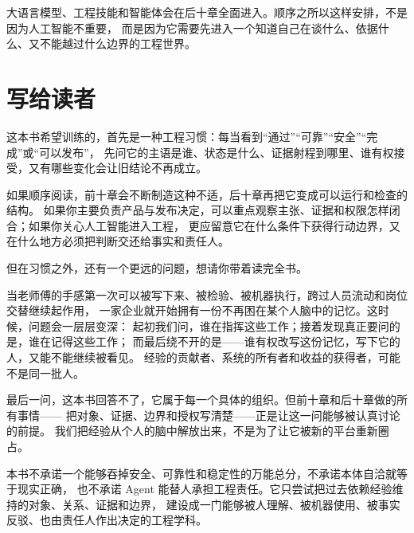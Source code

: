 大语言模型、工程技能和智能体会在后十章全面进入。顺序之所以这样安排，不是因为人工智能不重要，
而是因为它需要先进入一个知道自己在谈什么、依据什么、又不能越过什么边界的工程世界。

\section*{写给读者}

这本书希望训练的，首先是一种工程习惯：每当看到“通过”“可靠”“安全”“完成”或“可以发布”，
先问它的主语是谁、状态是什么、证据射程到哪里、谁有权接受，又有哪些变化会让旧结论不再成立。

如果顺序阅读，前十章会不断制造这种不适，后十章再把它变成可以运行和检查的结构。
如果你主要负责产品与发布决定，可以重点观察主张、证据和权限怎样闭合；如果你关心人工智能进入工程，
更应留意它在什么条件下获得行动边界，又在什么地方必须把判断交还给事实和责任人。

但在习惯之外，还有一个更远的问题，想请你带着读完全书。

当老师傅的手感第一次可以被写下来、被检验、被机器执行，跨过人员流动和岗位交替继续起作用，
一家企业就开始拥有一份不再困在某个人脑中的记忆。这时候，问题会一层层变深：
起初我们问，谁在指挥这些工作；接着发现真正要问的是，谁在记得这些工作；
而最后绕不开的是——谁有权改写这份记忆，写下它的人，又能不能继续被看见。
经验的贡献者、系统的所有者和收益的获得者，可能不是同一批人。

最后一问，这本书回答不了，它属于每一个具体的组织。但前十章和后十章做的所有事情——
把对象、证据、边界和授权写清楚——正是让这一问能够被认真讨论的前提。
我们把经验从个人的脑中解放出来，不是为了让它被新的平台重新圈占。

本书不承诺一个能够吞掉安全、可靠性和稳定性的万能总分，不承诺本体自洽就等于现实正确，
也不承诺 Agent 能替人承担工程责任。它只尝试把过去依赖经验维持的对象、关系、证据和边界，
建设成一门能够被人理解、被机器使用、被事实反驳、也由责任人作出决定的工程学科。
